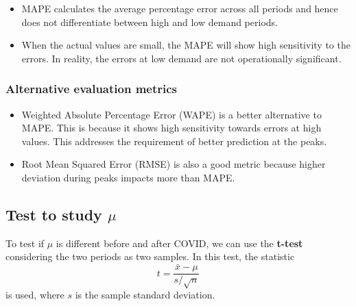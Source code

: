 \documentclass{article}
\begin{document}
\begin{itemize}
    \item MAPE calculates the average percentage error across all periods and hence does not differentiate between high and low demand periods.
    \item When the actual values are small, the MAPE will show high sensitivity to the errors. In reality, the errors at low demand are not operationally significant.
\end{itemize}

\subsubsection*{Alternative evaluation metrics}

\begin{itemize}
    \item Weighted Absolute Percentage Error (WAPE) is a better alternative to MAPE. This is because it shows high sensitivity towards errors at high values. This addresses the requirement of better prediction at the peaks.
    \item Root Mean Squared Error (RMSE) is also a good metric because higher deviation during peaks impacts more than MAPE.
\end{itemize}

\subsection{Test to study $\mu$}

To test if $\mu$ is different before and after COVID, we can use the \textbf{t-test} considering the two periods as two samples. In this test, the statistic
\begin{equation*}
    t = \frac{\bar{x} - \mu}{s/\sqrt{n}}
\end{equation*}
is used, where $s$ is the sample standard deviation.
\end{document}
